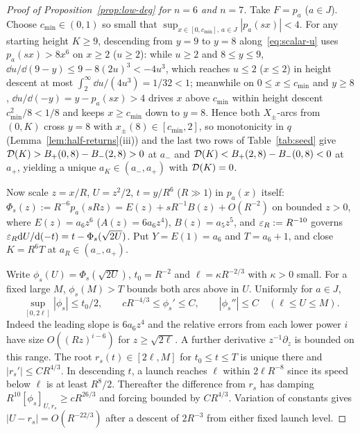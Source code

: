 \begin{proof}[Proof of Proposition~\ref{prop:low-deg} for $n=6$ and $n=7$]
Take $F=p_a$ ($a\in J$). Choose $c_{\min}\in(0,1)$ so small that $\sup_{x\in[0,c_{\min}],\,a\in J}|p_a(sx)|<4$. For any starting height $K\ge 9$, descending from $y=9$ to $y=8$ along~\eqref{eq:scalar-u} uses $p_a(sx)>8x^6$ on $x\ge 2$ ($u\ge 2$): while $u\ge 2$ and $8\le y\le 9$, $\dd u/\dd(9-y)\le 9-8(2u)^3<-4u^3$, which reaches $u\le 2$ ($x\le 2$) in height descent at most $\int_2^\infty\dd u/(4u^3)=1/32<1$; meanwhile on $0\le x\le c_{\min}$ and $y\ge 8$, $\dd u/\dd(-y)=y-p_a(sx)>4$ drives $x$ above $c_{\min}$ within height descent $c_{\min}^2/8<1/8$ and keeps $x\ge c_{\min}$ down to $y=8$. Hence both $X_\pm$-arcs from $(0,K)$ cross $y=8$ with $x_\pm(8)\in[c_{\min},2]$, so monotonicity in $q$ (Lemma~\ref{lem:half-returns}(iii)) and the last two rows of Table~\ref{tab:seed} give $\mathcal{D}(K)>B_+(0,8)-B_-(2,8)>0$ at $a_-$ and $\mathcal{D}(K)<B_+(2,8)-B_-(0,8)<0$ at $a_+$, yielding a unique $a_K\in(a_-,a_+)$ with $\mathcal{D}(K)=0$.

Now scale $z=x/R$, $U=z^2/2$, $t=y/R^6$ ($R\gg 1$) in $p_a(x)$ itself: $\Phi_s(z):=R^{-6}p_a(sRz)=E(z)+sR^{-1}B(z)+O(R^{-2})$ on bounded $z>0$, where $E(z)=a_6 z^6$ ($A(z)=6a_6 z^4$), $B(z)=a_5 z^5$, and $\varepsilon_R:=R^{-10}$ governs $\varepsilon_R\mathrm{d} U/\mathrm{d}(-t)=t-\Phi_s(\sqrt{2U})$. Put $Y=E(1)=a_6$ and $T=a_6+1$, and close $K=R^6 T$ at $a_R\in(a_-,a_+)$.

Write $\phi_s(U)=\Phi_s(\sqrt{2U})$, $t_0=R^{-2}$ and
$\ell=\kappa R^{-2/3}$ with $\kappa>0$ small. For a fixed large $M$,
$\phi_s(M)>T$ bounds both arcs above in $U$. Uniformly for $a\in J$,
\[
 \sup_{[0,2\ell]}|\phi_s|\le t_0/2,\qquad
 cR^{-4/3}\le\phi_s'\le C,\qquad |\phi_s''|\le C\quad(\ell\le U\le M).
\]
Indeed the leading slope is $6a_6z^4$ and the relative errors from each
lower power $i$ have size $O((Rz)^{i-6})$ for $z\ge\sqrt{2\ell}$.
A further derivative $z^{-1}\partial_z$ is bounded on this range.
The root $r_s(t)\in[2\ell,M]$ for $t_0\le t\le T$ is unique there and
$|r_s'|\le CR^{4/3}$. In descending $t$, a launch reaches $\ell$ within
$2\ell R^{-8}$ since its speed below $\ell$ is at least $R^8/2$.
Thereafter the difference from $r_s$ has damping
$R^{10}[\phi_s]_{U,r_s}\ge cR^{26/3}$ and forcing bounded by $CR^{4/3}$.
Variation of constants gives $|U-r_s|=O(R^{-22/3})$ after a descent
of $2R^{-3}$ from either fixed launch level.


\end{proof}
